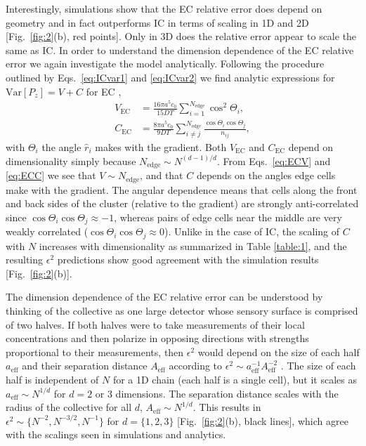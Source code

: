 Interestingly, simulations show that the EC relative error does depend on geometry and in fact outperforms IC in terms of scaling in 1D and 2D [Fig.\ \ref{fig:2}(b), red points]. Only in 3D does the relative error appear to scale the same as IC. In order to understand the dimension dependence of the EC relative error we again investigate the model analytically.
Following the procedure outlined by Eqs.\ \ref{eq:ICvar1} and \ref{eq:ICvar2} we find analytic expressions for $\text{Var}[P_z] = V + C$ for EC \cite{supinfo},
\begin{align}
    V_\text{EC} &= \frac{16\pi a^5c_0}{15DT} \sum_{i=1}^{N_\text{edge}} \cos^2\Theta_i \label{eq:ECV} , \\
    C_\text{EC} &= \frac{8\pi a^5c_0}{9DT} \sum_{i \neq j}^{N_\text{edge}} \frac{\cos\Theta_i\cos\Theta_j}{n_{ij}} , \label{eq:ECC}
\end{align}
with $\Theta_i$ the angle $\hat{r}_i$ makes with the gradient. Both $V_\text{EC}$ and $C_\text{EC}$ depend on dimensionality simply because $N_\text{edge} \sim N^{(d-1)/d}$. From Eqs.\ \ref{eq:ECV} and \ref{eq:ECC} we see that
$V \sim N_\text{edge}$,
and that $C$ depends on the angles edge cells make with the gradient. The angular dependence means that cells along the front and back sides of the cluster (relative to the gradient) are strongly anti-correlated since $\cos\Theta_i\cos\Theta_j \approx -1$,
whereas pairs of edge cells near the middle are very weakly correlated ($\cos\Theta_i\cos\Theta_j \approx 0$). Unlike in the case of IC, the scaling of $C$ with $N$ increases with dimensionality \cite{supinfo} as summarized in Table \ref{table:1}, and the resulting $\epsilon^2$ predictions show good agreement with the simulation results [Fig.\ \ref{fig:2}(b)].

The dimension dependence of the EC relative error can be understood by thinking of the collective as one large detector whose sensory surface is comprised of two halves. If both halves were to take measurements of their local concentrations and then polarize in opposing directions with strengths proportional to their measurements, then $\epsilon^2$ would depend on the size of each half
$a_\text{eff}$
and their separation distance
$A_\text{eff}$ according to $\epsilon^2  \sim a^{-1}_\text{eff}A^{-2}_\text{eff}$ \cite{mugler2016limits}.
The size of each half is independent of $N$ for a 1D chain (each half is a single cell), but it scales as
$a_\text{eff} \sim N^{1/d}$ for $d = 2$ or $3$ dimensions.
The separation distance scales with the radius of the collective for all $d$,
$A_\text{eff} \sim N^{1/d}$. This results in
$\epsilon^2 \sim \{N^{-2}, N^{-3/2}, N^{-1}\}$ for $d=\{1,2,3\}$ [Fig.\ \ref{fig:2}(b), black lines],
which agree with the scalings seen in simulations and analytics.

